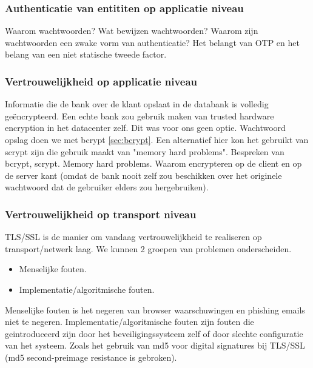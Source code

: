 \documentclass[11pt]{article}
\begin{document}
\subsubsection{Authenticatie van entititen op applicatie niveau}
Waarom wachtwoorden? Wat bewijzen wachtwoorden? Waarom zijn wachtwoorden een zwake vorm van authenticatie? Het belangt van OTP en het belang van een niet statische tweede factor. \cite{death_of_clever}\cite{pw_habit}

\subsubsection{Vertrouwelijkheid op applicatie niveau}
Informatie die de bank over de klant opslaat in de databank is volledig ge\"encrypteerd. Een echte bank zou gebruik maken van trusted hardware encryption in het datacenter zelf. Dit was voor ons geen optie. Wachtwoord opslag doen we met bcrypt \cite{bcrypt}\ref{sec:bcrypt}. Een alternatief hier kon het gebruikt van scrypt zijn die gebruik maakt van "memory hard problems"\cite{scrypt}.
Bespreken van bcrypt, scrypt. Memory hard problems. Waarom encrypteren op de client en op de server kant (omdat de bank nooit zelf zou beschikken over het originele wachtwoord dat de gebruiker elders zou hergebruiken).

\subsubsection{Vertrouwelijkheid op transport niveau}
TLS/SSL is de manier om vandaag vertrouwelijkheid te realiseren op transport/netwerk laag. We kunnen 2 groepen van problemen onderscheiden.

\begin{itemize}
\item Menselijke fouten.
\item Implementatie/algoritmische fouten.
\end{itemize}
Menselijke fouten is het negeren van browser waarschuwingen en phishing emails niet te negeren.
Implementatie/algoritmische fouten zijn fouten die geintroduceerd zijn door het beveiligingssysteem zelf of door slechte configuratie van het systeem. Zoals het gebruik van md5 voor digital signatures bij TLS/SSL (md5 second-preimage resistance is gebroken).
\end{document}
